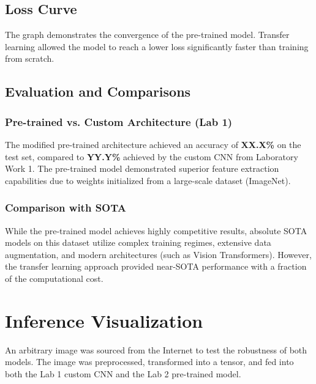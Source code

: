 \documentclass[12pt, a4paper]{article}
\begin{document}
\subsection{Loss Curve}

The graph demonstrates the convergence of the pre-trained model. Transfer learning allowed the model to reach a lower loss significantly faster than training from scratch.

\subsection{Evaluation and Comparisons}

\subsubsection{Pre-trained vs. Custom Architecture (Lab 1)}
The modified pre-trained architecture achieved an accuracy of \textbf{XX.X\%} on the test set, compared to \textbf{YY.Y\%} achieved by the custom CNN from Laboratory Work 1. The pre-trained model demonstrated superior feature extraction capabilities due to weights initialized from a large-scale dataset (ImageNet).

\subsubsection{Comparison with SOTA}
While the pre-trained model achieves highly competitive results, absolute SOTA models on this dataset utilize complex training regimes, extensive data augmentation, and modern architectures (such as Vision Transformers). However, the transfer learning approach provided near-SOTA performance with a fraction of the computational cost.

\section{Inference Visualization}
An arbitrary image was sourced from the Internet to test the robustness of both models. The image was preprocessed, transformed into a tensor, and fed into both the Lab 1 custom CNN and the Lab 2 pre-trained model.

\end{document}
